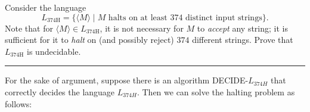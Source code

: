 \documentclass[11pt]{article}
\begin{document}

\item Consider the language $$L_{\text{374H}} = \{ \langle M\rangle
      \mid M \text{~halts on at least 374 distinct input strings}\}.$$ Note that
      for $\langle M\rangle \in L_{\text{374H}}$, it is not necessary
      for $M$ to {\em accept} any string; it is sufficient for it to
      {\em halt} on (and possibly reject) $374$ different strings. Prove that
      $L_{\text{374H}}$ is undecidable.
\hrule
\begin{solution}
For the sake of argument, suppose there is an algorithm DECIDE-$L_{374H}$ that correctly decides the language $L_{374H}$. Then we can solve the halting problem as follows:
\begin{quote}
        \newline
\end{quote}
\end{solution}
\end{document}

